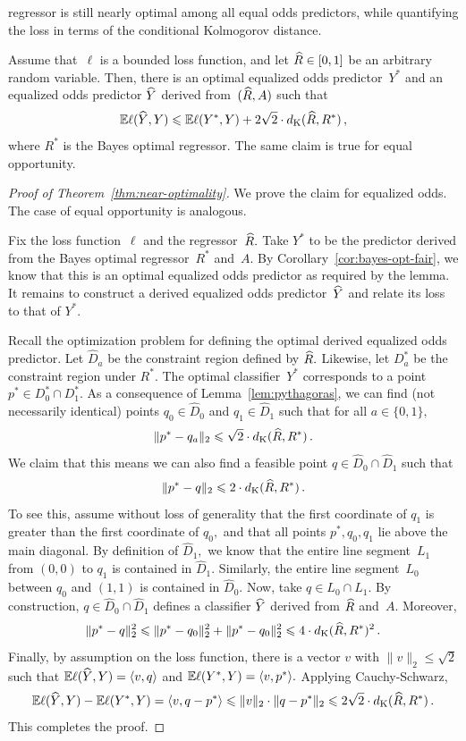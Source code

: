regressor is still nearly optimal among all equal odds predictors, while
quantifying the loss in terms of the conditional Kolmogorov distance.
%
\begin{theorem}
\label{cor:near-optimality}
\label{thm:near-optimality}
Assume that~$\ell$ is a bounded loss function, and let $\widehat{R}\in[0,1]$ be an
arbitrary random variable. Then, there is an optimal equalized odds
predictor~$Y^*$ and an equalized odds predictor $\widehat{Y}$ derived from~$(\widehat{R}, A)$
such that
\[
\mathbb{E}\ell(\widehat{Y}, Y)\leqslant \mathbb{E}\ell(Y^*,Y) + 2\sqrt{2}\cdot d_{\mathrm{K}}(\widehat{R},R^*)\,,
\]
where $R^*$ is the Bayes optimal regressor.  The same claim is true for equal
opportunity.
\end{theorem}

\begin{proof}[Proof of Theorem~\ref{thm:near-optimality}]
We prove the claim for equalized odds. The case of equal opportunity is
analogous.

Fix the loss function~$\ell$ and the regressor~$\widehat{R}.$ Take $Y^*$ to be the
predictor derived from the Bayes optimal regressor~$R^*$ and~$A.$ By
Corollary~\ref{cor:bayes-opt-fair}, we know that this is an optimal equalized
odds predictor as required by the lemma.
It remains to construct a derived equalized odds predictor~$\widehat{Y}$ and relate
its loss to that of $Y^*.$

Recall the optimization problem for defining the optimal derived equalized odds predictor.
Let $\widehat D_a$ be the constraint region defined by $\widehat{R}.$ Likewise,
let $D_a^*$ be
the constraint region under $R^*.$ The optimal classifier~$Y^*$ corresponds to a
point $p^*\in D_0^*\cap D_1^*.$ As a consequence of Lemma~\ref{lem:pythagoras},
we can find (not necessarily identical) points
$q_0\in \widehat D_0$ and $q_1\in \widehat D_1$ such that for all $a\in\{0,1\},$
\[
\|p^*-q_a\|_2\leqslant \sqrt{2}\cdot d_{\mathrm{K}}(\widehat{R}, R^*)\,.
\]
We claim that this means we can also find a feasible
point $q\in \widehat D_0\cap \widehat D_1$ such that
\[
\|p^*-q\|_2\leqslant 2\cdot d_{\mathrm{K}}(\widehat{R}, R^*)\,.
\]
To see this, assume without loss of generality that the first coordinate of
$q_1$ is greater than the first coordinate of $q_0,$ and that all points
$p^*,q_0,q_1$ lie
above the main diagonal. By definition of $\widehat D_1,$ we know that the
entire line segment~$L_1$ from $(0, 0)$ to $q_1$ is contained in $\widehat
D_1.$ Similarly, the entire line segment~$L_0$ between $q_0$ and $(1,1)$ is
contained in $\widehat D_0.$ Now, take $q\in L_0\cap L_1.$ By construction,
$q\in \widehat D_0\cap\widehat D_1$ defines a classifier $\widehat{Y}$ derived from
$\widehat{R}$ and~$A.$ Moreover,
\[
\|p^*-q\|_2^2 \leqslant \|p^*-q_0\|_2^2 + \|p^*-q_0\|_2^2
\leqslant 4\cdot d_{\mathrm{K}}(\widehat{R}, R^*)^2\,.
\]
Finally, by assumption on the loss function,
there is a vector $v$ with $\|v\|_2\le\sqrt{2}$ such that $\mathbb{E}\ell(\widehat{Y},
Y)=\langle v, q\rangle$ and $\mathbb{E}\ell(Y^*,Y)=\langle v, p^*\rangle.$ Applying
Cauchy-Schwarz,
\[
\mathbb{E}\ell(\widehat{Y},Y)-\mathbb{E}\ell(Y^*,Y)
= \langle v, q-p^*\rangle\leqslant \|v\|_2\cdot\|q-p^*\|_2
\leqslant 2\sqrt{2}\cdot d_{\mathrm{K}}(\widehat{R}, R^*)\,.
\]
This completes the proof.
\end{proof}
